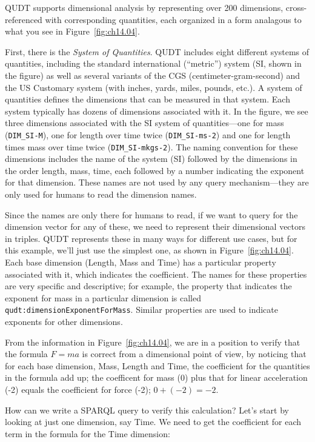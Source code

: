 QUDT supports dimensional analysis by representing over 200 dimensions,
cross-referenced with corresponding quantities, each organized in a 
form analagous to what you see in Figure~\ref{fig:ch14.04}.

First, there is the \emph{System of Quantities}. QUDT includes eight different
systems of quantities, including the standard international (``metric'')
system (SI, shown in the figure) as well as several variants of the CGS
(centimeter-gram-second) and the US Customary system (with inches,
yards, miles, pounds, etc.). A system of quantities defines the
dimensions that can be measured in that system. Each system typically
has dozens of dimensions associated with it. In the figure, we see three
dimensions associated with the SI system of quantities---one for mass
(\texttt{DIM\_SI-M}), one for length over time twice (\texttt{DIM\_SI-ms-2})
and one for length times mass over time twice (\texttt{DIM\_SI-mkgs-2}).
The naming convention for these dimensions includes the name of the
system (SI) followed by the dimensions in the order length, mass, time,
each followed by a number indicating the exponent for that dimension.
These names are not used by any query mechanism---they are only used for
humans to read the dimension names.

Since the names are only there for humans to read, if we want to query
for the dimension vector for any of these, we need to represent their
dimensional vectors in triples.  QUDT represents these in many ways for 
different use cases, but for this example, we'll just use the simplest 
one, as shown in Figure~\ref{fig:ch14.04}.  Each base dimension (Length, Mass and Time) has a particular
property associated with it, which indicates the coefficient.  The names for 
these properties are very specific and descriptive; for example, the property that indicates
the exponent for mass in a particular dimension is called \texttt{qudt:dimensionExponentForMass}. Similar properties 
are used to indicate exponents for other dimensions. 

From the information in Figure~\ref{fig:ch14.04}, 
we are in
a position to verify  that the formula $F = ma$ 
is correct from a dimensional point of view, by noticing that for each base 
dimension, Mass, Length and Time, 
the coefficient for the quantities in the formula add up; the coefficent for mass (0) plus that for linear acceleration (-2)
equals the coefficient for force (-2); $0 + (-2) = -2$.

How can we write a SPARQL query to verify this calculation?  Let's start by 
looking at just one dimension, say Time.  We need to get the coefficient for each
term in the formula for the Time dimension:

